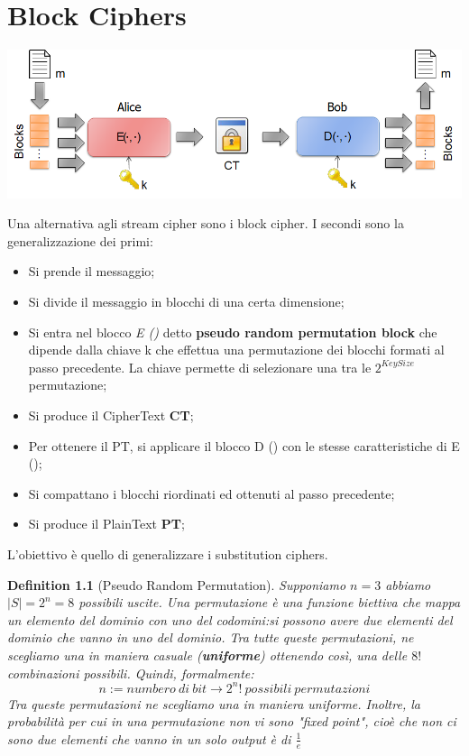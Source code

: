 \documentclass{book}
\newtheorem{definition}{Definition}[section]
\theoremstyle{remark}
\begin{document}
\chapter{Block Ciphers}
\begin{center}
	\includegraphics[scale=0.5]{blockCipher.png}
\end{center}
Una alternativa agli stream cipher sono i block cipher\@. I secondi sono la generalizzazione dei primi:
\begin{itemize}
	\item Si prende il messaggio;\@
	\item Si divide il messaggio in blocchi di una certa dimensione;\@
	\item Si entra nel blocco \emph{E ()} detto \textbf{pseudo random permutation block} che dipende dalla chiave k che effettua una permutazione dei blocchi formati al passo precedente\@. La chiave permette di selezionare una tra le \(2^{KeySize}\) permutazione;\@
	\item Si produce il CipherText \textbf{CT};\@
	\item Per ottenere il PT, si applicare il blocco D () con le stesse caratteristiche di E ();\@
	\item Si compattano i blocchi riordinati ed ottenuti al passo precedente;\@
	\item Si produce il PlainText \textbf{PT};\@
\end{itemize}
L'obiettivo è quello di generalizzare i substitution ciphers\@.
\begin{definition}[Pseudo Random Permutation]
	Supponiamo \(n=3\) abbiamo \(|S|=2^n=8\) possibili uscite\@. Una permutazione è una funzione biettiva che mappa un elemento del dominio con uno del codomini:\@non si possono avere due elementi del dominio che vanno in uno del dominio\@.\newline
	Tra tutte queste permutazioni, ne scegliamo una in maniera casuale (\textbf{uniforme}) ottenendo così, una delle \(8!\) combinazioni possibili\@.
	Quindi, formalmente:
	\begin{equation}
		n:= numbero\ di\ bit \rightarrow 2^{n}!\ possibili\ permutazioni
	\end{equation}
	Tra queste permutazioni ne scegliamo una in maniera uniforme\@. Inoltre, la probabilità per cui in una permutazione non vi sono "fixed point", cioè che non ci sono due elementi che vanno in un solo output è di \(\frac{1}{e}\)
\end{definition}
\end{document}

